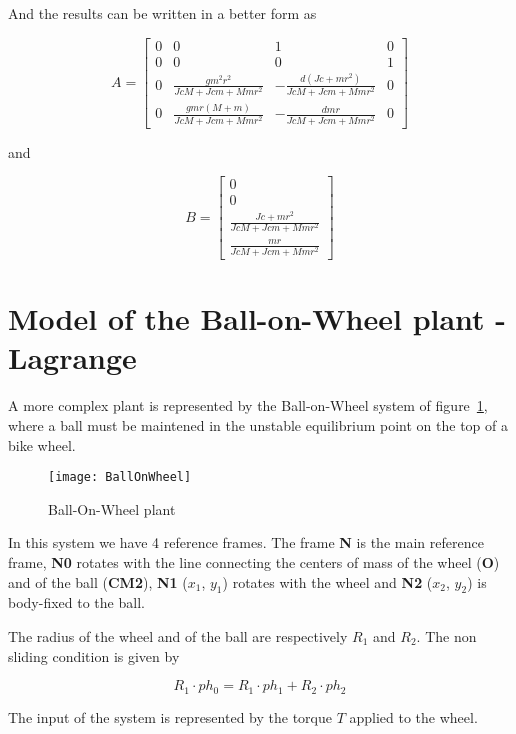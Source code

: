 And the results can be written in a better form as

$$
A=\left[\begin{matrix}0 & 0 & 1 & 0\\0 & 0 & 0 & 1\\0 & \frac{g m^{2} r^{2}}{Jc 
M + Jc m + M m r^{2}} & - \frac{d \left(Jc + m r^{2}\right)}{Jc M + Jc m + M m 
r^{2}} & 0\\0 & \frac{g m r \left(M + m\right)}{Jc M + Jc m + M m r^{2}} & - 
\frac{d m r}{Jc M + Jc m + M m r^{2}} & 0\end{matrix}\right]
$$

and 

$$
B=\left[\begin{matrix}0\\0\\\frac{Jc + m r^{2}}{Jc M + Jc m + M m 
r^{2}}\\\frac{m r}{Jc M + Jc m + M m r^{2}}\end{matrix}\right]
$$

\section{Model of the Ball-on-Wheel plant - Lagrange}

A more complex plant is represented by the Ball-on-Wheel system of 
figure~\ref{F9b}, where a ball must be maintened in the unstable equilibrium 
point on the top of a bike wheel.

\begin{figure}[htbp]	%
\centering
\texttt{[image: BallOnWheel]}
\caption{Ball-On-Wheel plant}
\label{F9b}
\end{figure}

In this system we have 4 reference frames. The frame \textbf{N} is the main 
reference frame, \textbf{N0} rotates with the line connecting the centers of 
mass of the wheel (\textbf{O}) and of the ball (\textbf{CM2}), \textbf{N1} 
($x_1$, $y_1$) rotates with the wheel and \textbf{N2} ($x_2$, $y_2$) is 
body-fixed to the ball.

The radius of the wheel and of the ball are respectively $R_1$ and $R_2$. The 
non sliding condition is given by

$$
R_1 \cdot ph_0=R_1 \cdot ph_1 + R_2 \cdot ph_2
$$

The input of the system is represented by the torque $T$ applied to the wheel.

